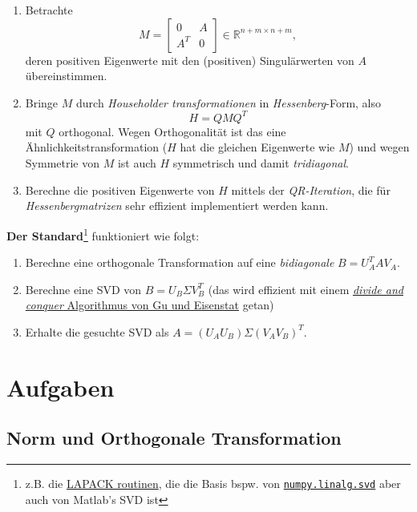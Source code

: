 \documentclass[
]{book}
\providecommand{\tightlist}{%
  \setlength{\itemsep}{0pt}\setlength{\parskip}{0pt}}
\theoremstyle{definition}
\theoremstyle{definition}
\theoremstyle{definition}
\theoremstyle{definition}
\theoremstyle{remark}
\begin{document}
\begin{enumerate}
\def\labelenumi{\arabic{enumi}.}
\tightlist
\item
  Betrachte
  \[M=\begin{bmatrix} 0 & A \\ A^T & 0 \end{bmatrix} \in \mathbb R^{n+m \times n+m},\]
  deren positiven Eigenwerte mit
  den (positiven) Singulärwerten von \(A\) übereinstimmen.
\item
  Bringe \(M\) durch \emph{Householder transformationen} in \emph{Hessenberg}-Form, also
  \[ H = QMQ^T \]
  mit \(Q\) orthogonal. Wegen Orthogonalität ist das eine
  Ähnlichkeitstransformation (\(H\) hat die gleichen Eigenwerte wie \(M\)) und
  wegen Symmetrie von \(M\) ist auch \(H\) symmetrisch und damit \emph{tridiagonal}.
\item
  Berechne die positiven Eigenwerte von \(H\) mittels der \emph{QR-Iteration}, die
  für \emph{Hessenbergmatrizen} sehr effizient implementiert werden kann.
\end{enumerate}

\textbf{Der Standard}\footnote{z.B. die
  \href{https://www.netlib.org/lapack/lug/node53.html\#3465}{LAPACK routinen}, die die Basis bspw. von \href{https://numpy.org/doc/stable/reference/generated/numpy.linalg.svd.html}{\texttt{numpy.linalg.svd}} aber auch von
  Matlab's SVD ist} funktioniert wie folgt:

\begin{enumerate}
\def\labelenumi{\arabic{enumi}.}
\tightlist
\item
  Berechne eine orthogonale Transformation auf eine \emph{bidiagonale}
  \(B=U_A^TAV_A\).
\item
  Berechne eine SVD von \(B=U_B\Sigma V_B^T\) (das wird effizient mit einem
  \href{https://dl.acm.org/doi/10.1137/S0895479892241287}{\emph{divide and conquer} Algorithmus von Gu und Eisenstat} getan)
\item
  Erhalte die gesuchte SVD als \(A=(U_AU_B)\Sigma (V_AV_B)^T\).
\end{enumerate}

\hypertarget{aufgaben}{%
\section{Aufgaben}\label{aufgaben}}

\hypertarget{norm-und-orthogonale-transformation}{%
\subsection{Norm und Orthogonale Transformation}\label{norm-und-orthogonale-transformation}}
\end{document}
